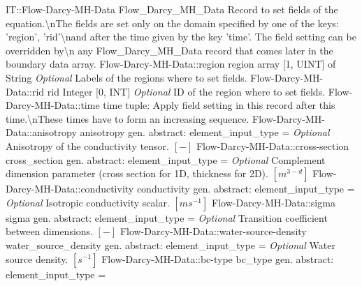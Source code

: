 \begin{RecordType}
	{IT::Flow-Darcy-MH-Data}
	{Flow{\_}Darcy{\_}MH{\_}Data}
	{}%
	{}%
	{{{Record to set fields of the equation.{\textbackslash}nThe fields are set only on the domain specified by one of the keys: 'region', 'rid'{\textbackslash}nand after the time given by the key 'time'. The field setting can be overridden by{\textbackslash}n any Flow{\_}Darcy{\_}MH{\_}Data record that comes later in the boundary data array.}%
}}
		\RecKey
			{Flow-Darcy-MH-Data::region}
			{region}
			{{array [1, UINT] of }{String}}{}
			{ \it{Optional}}
			{{{Labels of the regions where to set fields. }%
}}
		\RecKey
			{Flow-Darcy-MH-Data::rid}
			{rid}
			{{Integer [0, INT]}}{}
			{ \it{Optional}}
			{{{ID of the region where to set fields.}%
}}
		\RecKey
			{Flow-Darcy-MH-Data::time}
			{time}
			{{tuple: }}{}
			{ }
			{{{Apply field setting in this record after this time.{\textbackslash}nThese times have to form an increasing sequence.}%
}}
		\RecKey
			{Flow-Darcy-MH-Data::anisotropy}
			{anisotropy}
			{{gen. abstract: }}{{element{\_}input{\_}type}{ = }}
			{ \it{Optional}}
			{{{Anisotropy of the conductivity tensor. }{$[-]$}%
}}
		\RecKey
			{Flow-Darcy-MH-Data::cross-section}
			{cross{\_}section}
			{{gen. abstract: }}{{element{\_}input{\_}type}{ = }}
			{ \it{Optional}}
			{{{Complement dimension parameter (cross section for 1D, thickness for 2D). }{$[m^{3-d}]$}%
}}
		\RecKey
			{Flow-Darcy-MH-Data::conductivity}
			{conductivity}
			{{gen. abstract: }}{{element{\_}input{\_}type}{ = }}
			{ \it{Optional}}
			{{{Isotropic conductivity scalar. }{$[ms^{-1}]$}%
}}
		\RecKey
			{Flow-Darcy-MH-Data::sigma}
			{sigma}
			{{gen. abstract: }}{{element{\_}input{\_}type}{ = }}
			{ \it{Optional}}
			{{{Transition coefficient between dimensions. }{$[-]$}%
}}
		\RecKey
			{Flow-Darcy-MH-Data::water-source-density}
			{water{\_}source{\_}density}
			{{gen. abstract: }}{{element{\_}input{\_}type}{ = }}
			{ \it{Optional}}
			{{{Water source density. }{$[s^{-1}]$}%
}}
		\RecKey
			{Flow-Darcy-MH-Data::bc-type}
			{bc{\_}type}
			{{gen. abstract: }}{{element{\_}input{\_}type}{ = }}

\end{RecordType}
